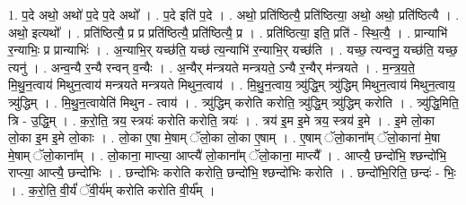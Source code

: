 \documentclass[17pt]{extarticle}
\begin{document}
1. प॒दे अथो॒ अथो॑ प॒दे प॒दे अथो᳚ । . प॒दे इति॑ प॒दे । . अथो॒ प्रति॑ष्ठित्यै॒ प्रति॑ष्ठित्या॒ अथो॒ अथो॒ प्रति॑ष्ठित्यै । . अथो॒ इत्यथो᳚ । . प्रति॑ष्ठित्यै॒ प्र प्र प्रति॑ष्ठित्यै॒ प्रति॑ष्ठित्यै॒ प्र । . प्रति॑ष्ठित्या॒ इति॒ प्रति॑ - स्थि॒त्यै॒ । . प्रान्याभि॑ र॒न्याभिः॒ प्र प्रान्याभिः॑ । . अ॒न्याभि॒र् यच्छ॑ति॒ यच्छ॑ त्य॒न्याभि॑ र॒न्याभि॒र् यच्छ॑ति । . यच्छ॒ त्यन्वनु॒ यच्छ॑ति॒ यच्छ॒ त्यनु॑ । . अन्व॒न्यै र॒न्यै रन्वन् व॒न्यैः । . अ॒न्यैर् म॑न्त्रयते मन्त्रयते॒ ऽन्यै र॒न्यैर् म॑न्त्रयते । . म॒न्त्र॒य॒ते॒ मि॒थु॒न॒त्वाय॑ मिथुन॒त्वाय॑ मन्त्रयते मन्त्रयते मिथुन॒त्वाय॑ । . मि॒थु॒न॒त्वाय॒ त्र्यु॑द्धि॒म् त्र्यु॑द्धिम् मिथुन॒त्वाय॑ मिथुन॒त्वाय॒ त्र्यु॑द्धिम् । . मि॒थु॒न॒त्वायेति॑ मिथुन - त्वाय॑ । . त्र्यु॑द्धिम् करोति करोति॒ त्र्यु॑द्धि॒म् त्र्यु॑द्धिम् करोति । . त्र्यु॑द्धि॒मिति॒ त्रि - उ॒द्धि॒म् । . क॒रो॒ति॒ त्रय॒ स्त्रयः॑ करोति करोति॒ त्रयः॑ । . त्रय॑ इ॒म इ॒मे त्रय॒ स्त्रय॑ इ॒मे । . इ॒मे लो॒का लो॒का इ॒म इ॒मे लो॒काः । . लो॒का ए॒षा मे॒षाम् ॅलो॒का लो॒का ए॒षाम् । . ए॒षाम् ॅलो॒काना᳚म् ॅलो॒काना॑ मे॒षा मे॒षाम् ॅलो॒काना᳚म् । . लो॒काना॒ माप्त्या॒ आप्त्यै॑ लो॒काना᳚म् ॅलो॒काना॒ माप्त्यै᳚ । . आप्त्यै॒ छन्दो॑भि॒ श्छन्दो॑भि॒ राप्त्या॒ आप्त्यै॒ छन्दो॑भिः । . छन्दो॑भिः करोति करोति॒ छन्दो॑भि॒ श्छन्दो॑भिः करोति । . छन्दो॑भि॒रिति॒ छन्दः॑ - भिः॒ । . क॒रो॒ति॒ वी॒र्यं॑ ॅवी॒र्य॑म् करोति करोति वी॒र्य᳚म् । \newline
\end{document}
